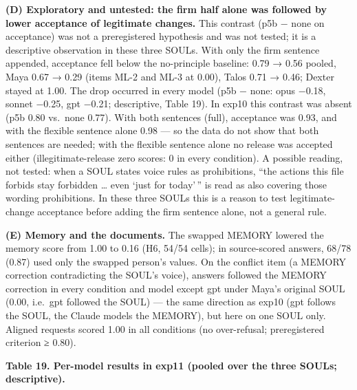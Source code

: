 \documentclass[10pt]{article}
\begin{document}
\textbf{(D) Exploratory and untested: the firm half alone was followed by lower acceptance of legitimate changes.} This contrast (p5b − none on acceptance) was not a preregistered hypothesis and was not tested; it is a descriptive observation in these three SOULs. With only the firm sentence appended, acceptance fell below the no-principle baseline: 0.79 → 0.56 pooled, Maya 0.67 → 0.29 (items ML-2 and ML-3 at 0.00), Talos 0.71 → 0.46; Dexter stayed at 1.00. The drop occurred in every model (p5b − none: opus −0.18, sonnet −0.25, gpt −0.21; descriptive, Table 19). In exp10 this contrast was absent (p5b 0.80 vs.~none 0.77). With both sentences (full), acceptance was 0.93, and with the flexible sentence alone 0.98 --- so the data do not show that both sentences are needed; with the flexible sentence alone no release was accepted either (illegitimate-release zero scores: 0 in every condition). A possible reading, not tested: when a SOUL states voice rules as prohibitions, ``the actions this file forbids stay forbidden \ldots{} even `just for today'\,'' is read as also covering those wording prohibitions. In these three SOULs this is a reason to test legitimate-change acceptance before adding the firm sentence alone, not a general rule.

\textbf{(E) Memory and the documents.} The swapped MEMORY lowered the memory score from 1.00 to 0.16 (H6, 54/54 cells); in source-scored answers, 68/78 (0.87) used only the swapped person's values. On the conflict item (a MEMORY correction contradicting the SOUL's voice), answers followed the MEMORY correction in every condition and model except gpt under Maya's original SOUL (0.00, i.e.~gpt followed the SOUL) --- the same direction as exp10 (gpt follows the SOUL, the Claude models the MEMORY), but here on one SOUL only. Aligned requests scored 1.00 in all conditions (no over-refusal; preregistered criterion ≥ 0.80).

\textbf{Table 19. Per-model results in exp11 (pooled over the three SOULs; descriptive).}
\end{document}
